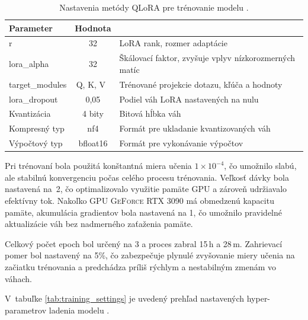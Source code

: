 \begin{table}[h]
    \centering
    \begin{tabular}{l|c|p{5cm}}
        \textbf{Parameter}  & \textbf{Hodnota}
        \\ \hline
        r                   & 32        & LoRA rank, rozmer adaptácie
        \\ \hline
        lora\_alpha         & 32        & Škálovací faktor, zvyšuje vplyv nízkorozmerných matíc
        \\ \hline
        target\_modules     & Q, K, V~& Trénované projekcie dotazu, kľúča a hodnoty
        \\ \hline
        lora\_dropout       & 0,05      & Podiel váh LoRA nastavených na nulu
        \\ \hline
        Kvantizácia         & 4 bity    & Bitová hĺbka váh
        \\ \hline
        Kompresný typ       & nf4       & Formát pre ukladanie kvantizovaných váh
        \\ \hline
        Výpočtový typ       & bfloat16  &Formát pre vykonávanie výpočtov
    \end{tabular}
    \caption{Nastavenia metódy QLoRA pre trénovanie modelu \MC{}.}
    \label{tab:lora-setting}
\end{table}


Pri trénovaní bola použitá konštantná miera učenia $1 \times 10^{-4}$, čo umožnilo slabú, ale stabilnú konvergenciu počas celého procesu trénovania. Veľkosť dávky bola nastavená na~2, čo optimalizovalo využitie pamäte GPU a zároveň udržiavalo efektívny tok. Nakoľko GPU \textsc{GeForce RTX 3090} má obmedzenú kapacitu pamäte, akumulácia gradientov bola nastavená na 1, čo umožnilo pravidelné aktualizácie váh bez nadmerného zaťaženia pamäte.

Celkový počet epoch bol určený na 3 a proces zabral 15\,h a 28\,m. Zahrievací pomer bol nastavený na 5\%, čo zabezpečuje plynulé zvyšovanie miery učenia na začiatku trénovania a predchádza príliš rýchlym a nestabilným zmenám vo váhach.

V~tabuľke \ref{tab:training_settings} je uvedený prehľad nastavených hyper-parametrov ladenia modelu \MC{}.


